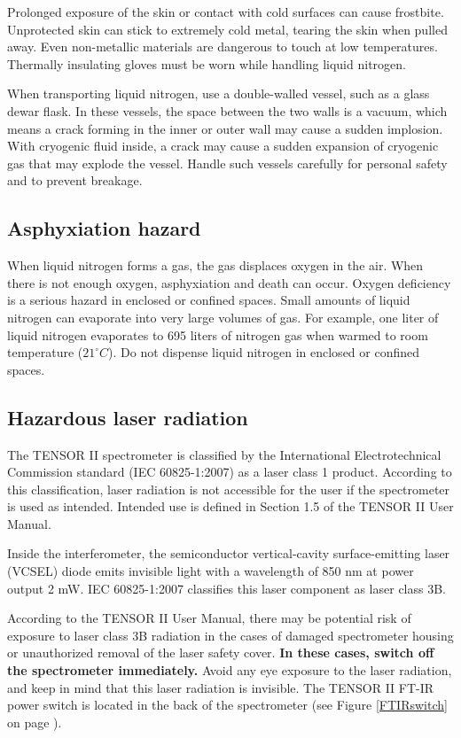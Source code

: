 \documentclass[12pt]{article}
\begin{document}
Prolonged exposure of the skin or contact with cold surfaces can cause frostbite. Unprotected skin can stick to extremely cold metal, tearing the skin when pulled away. Even non-metallic materials are dangerous to touch at low temperatures. Thermally insulating gloves must be worn while handling liquid nitrogen.

When transporting liquid nitrogen, use a double-walled vessel, such as a glass dewar flask. In these vessels, the space between the two walls is a vacuum, which means a crack forming in the inner or outer wall may cause a sudden implosion. With cryogenic fluid inside, a crack may cause a sudden expansion of cryogenic gas that may explode the vessel. Handle such vessels carefully for personal safety and to prevent breakage.

\subsection{Asphyxiation hazard}
When liquid nitrogen forms a gas, the gas displaces oxygen in the air. When there is not enough oxygen, asphyxiation and death can occur. Oxygen deficiency is a serious hazard in enclosed or confined spaces. Small amounts of liquid nitrogen can evaporate into very large volumes of gas. For example, one liter of liquid nitrogen evaporates to 695 liters of nitrogen gas when warmed to room temperature ($21^\circ C$). Do not dispense liquid nitrogen in enclosed or confined spaces.

\subsection{Hazardous laser radiation}
\label{subsec:laser}
The TENSOR II spectrometer is classified by the International Electrotechnical Commission standard (IEC 60825-1:2007) as a laser class 1 product. According to this classification, laser radiation is not accessible for the user if the spectrometer is used as intended. Intended use is defined in Section 1.5 of the TENSOR II User Manual\cite{Bruker1}.

Inside the interferometer, the semiconductor vertical-cavity surface-emitting laser (VCSEL) diode emits invisible light with a wavelength of 850 nm at power output 2 mW. IEC 60825-1:2007 classifies this laser component as laser class 3B\cite{Bruker1}.

According to the TENSOR II User Manual, there may be potential risk of exposure to laser class 3B radiation in the cases of damaged spectrometer housing or unauthorized removal of the laser safety cover. \textbf{In these cases, switch off the spectrometer immediately.} Avoid any eye exposure to the laser radiation, and keep in mind that this laser radiation is invisible. The TENSOR II FT-IR power switch is located in the back of the spectrometer (see Figure \ref{FTIRswitch} on page \pageref{FTIRswitch}).
\end{document}
